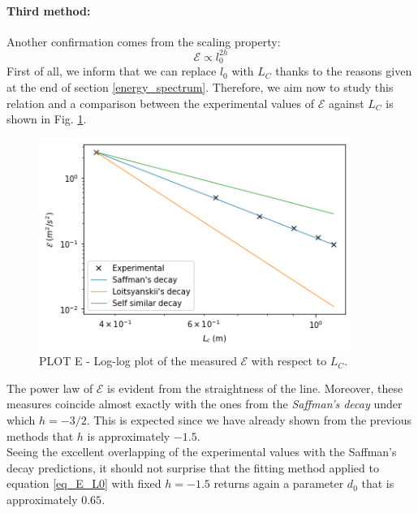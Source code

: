 \documentclass[11pt,titlepage]{article}
\begin{document}
\paragraph{Third method:}
Another confirmation comes from the scaling property:
\begin{equation}\label{eq_E_L0}
	\mathcal{E} \propto l_0^{2h}
\end{equation}
First of all, we inform that we can replace $l_0$ with $L_C$ thanks to the reasons given at the end of section \ref{energy_spectrum}. Therefore, we aim now to study this relation and a comparison between the experimental values of $\mathcal{E}$ against $L_C$ is shown in Fig. \ref{fig7}. 

	\begin{center} 
	\begin{figure} [h!]
		\centering
		\includegraphics[width = 4in]{./figures/ex1_5_3.png}
		\caption{PLOT E - Log-log plot of the measured $\mathcal{E}$ with respect to $L_C$.}
		\label{fig7}
	\end{figure}
\end{center}

The power law of $\mathcal{E}$ is evident from the straightness of the line. Moreover, these measures coincide almost exactly with the ones from the \emph{Saffman's decay} under which $h=-3/2$. This is expected since we have already shown from the previous methods that $h$ is approximately $-1.5$. \\
Seeing the excellent overlapping of the experimental values with the Saffman's decay predictions, it should not surprise that the fitting method applied  to equation \ref{eq_E_L0} with fixed $h=-1.5$ returns again a parameter $d_0$ that is approximately $0.65$. 
\end{document}
